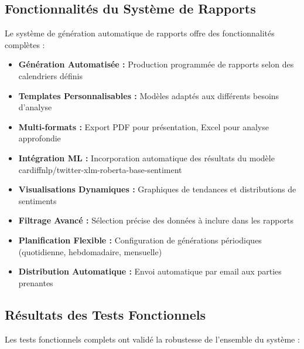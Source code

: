 \subsection{Fonctionnalités du Système de Rapports}

Le système de génération automatique de rapports offre des fonctionnalités complètes :

\begin{itemize}
    \item \textbf{Génération Automatisée :} Production programmée de rapports selon des calendriers définis
    \item \textbf{Templates Personnalisables :} Modèles adaptés aux différents besoins d'analyse
    \item \textbf{Multi-formats :} Export PDF pour présentation, Excel pour analyse approfondie
    \item \textbf{Intégration ML :} Incorporation automatique des résultats du modèle cardiffnlp/twitter-xlm-roberta-base-sentiment
    \item \textbf{Visualisations Dynamiques :} Graphiques de tendances et distributions de sentiments
    \item \textbf{Filtrage Avancé :} Sélection précise des données à inclure dans les rapports
    \item \textbf{Planification Flexible :} Configuration de générations périodiques (quotidienne, hebdomadaire, mensuelle)
    \item \textbf{Distribution Automatique :} Envoi automatique par email aux parties prenantes
\end{itemize}

\subsection{Résultats des Tests Fonctionnels}

Les tests fonctionnels complets ont validé la robustesse de l'ensemble du système :

